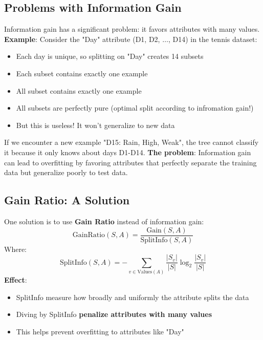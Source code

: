 \documentclass[a4paper]{article}
\theoremstyle{definition}
\begin{document}
\subsection{Problems with Information Gain}
Information gain has a significant problem: it favors attributes with many values.
\vspace{1em}
\noindent 
\newline
\textbf{Example}: Consider the "Day" attribute (D1, D2, $\ldots$, D14) in the tennis dataset:
\begin{itemize}
    \item Each day is unique, so splitting on "Day" creates 14 subsets 
    \item Each subset contains exactly one example 
    \item All subset contains exactly one example 
    \item All subsets are perfectly pure (optimal split according to infromation gain!)
    \item But this is useless! It won't generalize to new data
\end{itemize}
If we encounter a new example "D15: Rain, High, Weak", the tree cannot classify it because it only knows about days D1-D14.
\vspace{1em}
\noindent 
\newline
\textbf{The problem}: Information gain can lead to overfitting by favoring attributes that perfectly separate the training data 
but generalize poorly to test data.
\subsection{Gain Ratio: A Solution}
One solution is to use \textbf{Gain Ratio} instead of information gain:
\[
  \text{GainRatio}(S, A) = \frac{\text{Gain}(S, A)}{\text{SplitInfo}(S, A)}
\]
Where:
\[
  \text{SplitInfo}(S, A) = - \sum_{v \in \text{Values}(A)} \frac{|S_v|}{|S|} \log_2 \frac{|S_v|}{|S|}
\]
\textbf{Effect}:
\begin{itemize}
    \item SplitInfo measure how broadly and uniformly the attribute splits the data 
    \item Diving by SplitInfo \textbf{penalize attributes with many values}
    \item This helps prevent overfitting to attributes like "Day"
\end{itemize}
\end{document}
